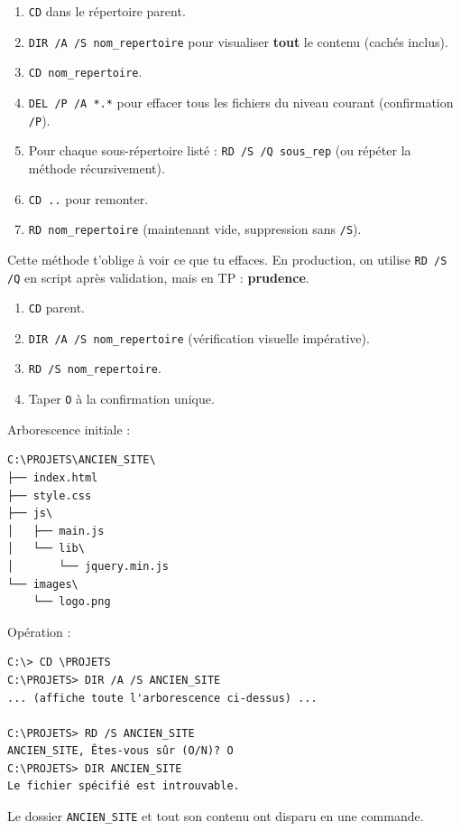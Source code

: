 \documentclass[11pt]{article}
\begin{document}
\begin{methode}
\begin{enumerate}
    \item \texttt{CD} dans le répertoire parent.
    \item \texttt{DIR /A /S nom\_repertoire} pour visualiser \textbf{tout} le contenu (cachés inclus).
    \item \texttt{CD nom\_repertoire}.
    \item \texttt{DEL /P /A *.*} pour effacer tous les fichiers du niveau courant (confirmation \texttt{/P}).
    \item Pour chaque sous-répertoire listé : \texttt{RD /S /Q sous\_rep} (ou répéter la méthode récursivement).
    \item \texttt{CD ..} pour remonter.
    \item \texttt{RD nom\_repertoire} (maintenant vide, suppression sans \texttt{/S}).
\end{enumerate}
Cette méthode t'oblige à voir ce que tu effaces. En production, on utilise \texttt{RD /S /Q} en script après validation, mais en TP : \textbf{prudence}.
\end{methode}

\begin{methode}
\begin{enumerate}
    \item \texttt{CD} parent.
    \item \texttt{DIR /A /S nom\_repertoire} (vérification visuelle impérative).
    \item \texttt{RD /S nom\_repertoire}.
    \item Taper \texttt{O} à la confirmation unique.
\end{enumerate}
\end{methode}

\begin{exemplebox}
Arborescence initiale :
\begin{lstlisting}
C:\PROJETS\ANCIEN_SITE\
├── index.html
├── style.css
├── js\
│   ├── main.js
│   └── lib\
│       └── jquery.min.js
└── images\
    └── logo.png
\end{lstlisting}
Opération :
\begin{lstlisting}
C:\> CD \PROJETS
C:\PROJETS> DIR /A /S ANCIEN_SITE
... (affiche toute l'arborescence ci-dessus) ...

C:\PROJETS> RD /S ANCIEN_SITE
ANCIEN_SITE, Êtes-vous sûr (O/N)? O
C:\PROJETS> DIR ANCIEN_SITE
Le fichier spécifié est introuvable.
\end{lstlisting}
Le dossier \texttt{ANCIEN\_SITE} et tout son contenu ont disparu en une commande.
\end{exemplebox}
\end{document}
